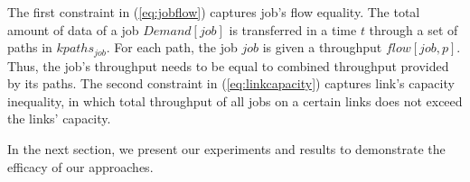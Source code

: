 %

The first constraint in (\ref{eq:jobflow}) captures job's flow equality. The total amount of data of a job $Demand[job]$ is transferred in a time $t$ through a set of paths in $kpaths_{job}$. For each path, the job $job$ is given a throughput $flow[job, p]$. Thus, the job's throughput needs to be equal to combined throughput provided by its paths. The second constraint in (\ref{eq:linkcapacity}) captures link's capacity inequality, in which total throughput of all jobs on a certain links does not exceed the links' capacity.

In the next section, we present our experiments and results to demonstrate the efficacy of our approaches.
